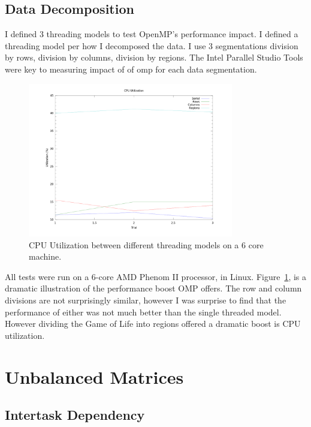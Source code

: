 \documentclass[journal,10pt,onecolumn]{IEEEtran}
\begin{document}
\subsection{Data Decomposition}
I defined 3 threading models to test OpenMP's performance impact. I defined a threading model
per how I decomposed the data.  I use 3 segmentations division by rows, division by columns, 
division by regions.  The Intel Parallel Studio Tools were key to measuring impact of of omp
for each data segmentation. 

\begin{figure}[!t]
\begin{center}
\includegraphics[width=0.8\textwidth]{figures/utilization_compared.png}
\caption{CPU Utilization between different threading models on a 6 core machine.}
\label{fig:gol_cpu_utilization}
\end{center}
\end{figure}

All tests were run on a 6-core AMD Phenom II processor, in Linux. Figure~\ref{fig:gol_cpu_utilization},
is a dramatic illustration of the performance boost OMP offers.  The row and column divisions are not 
surprisingly similar, however I was surprise to find that the performance of either was not much better 
than the single threaded model.  However dividing the Game of Life into regions offered a dramatic
boost is CPU utilization.  

\section{Unbalanced Matrices}

\subsection{Intertask Dependency}
\end{document}
